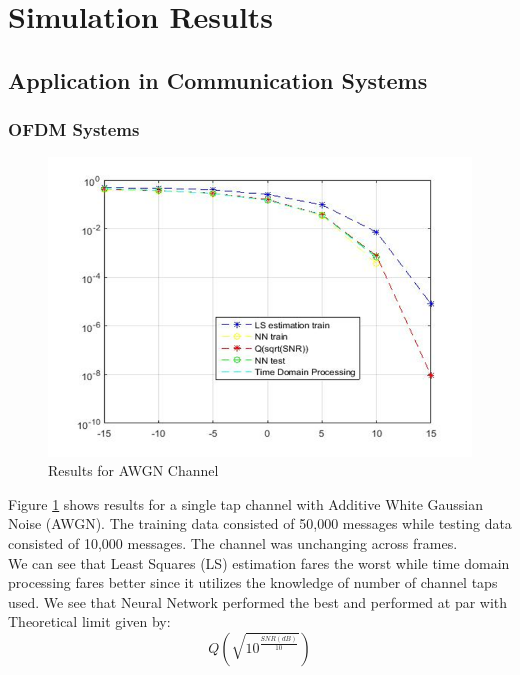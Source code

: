 \section{Simulation Results}
\subsection{Application in Communication Systems}
\subsubsection{OFDM Systems}
\begin{figure}[htbp]
  \centering
  \includegraphics[width=\textwidth]{./Figures/awgn_results.png}
  \caption{Results for AWGN Channel}
  \label{fig:awgn_results}
\end{figure}
Figure \ref{fig:awgn_results} shows results for a single tap channel with Additive White Gaussian Noise (AWGN). The training data consisted of 50,000 messages while testing data consisted of 10,000 messages. The channel was unchanging across frames.  \\
We can see that Least Squares (LS) estimation fares the worst while time domain processing fares better since it utilizes the knowledge of number of channel taps used. We see that Neural Network performed the best and performed at par with Theoretical limit given by:\\
$$Q(\sqrt{10^{\frac{SNR(dB)}{10}}})$$
